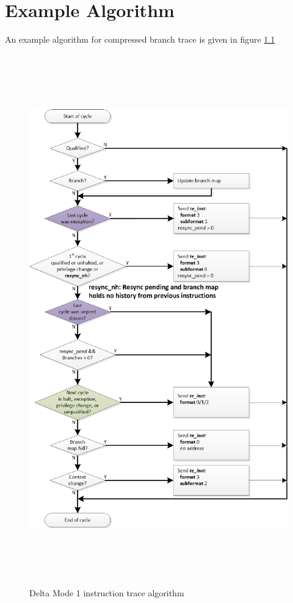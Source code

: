 \chapter{Example Algorithm}

An example algorithm for compressed branch trace is given in figure \ref{fig:algo} 

\begin{figure}[l]
\begin{center}
  \includegraphics[height=23cm, width=15cm]{algo.pdf}
  \caption{Delta Mode 1 instruction trace algorithm}
  \label{fig:algo}
\end{center}
\end{figure}

